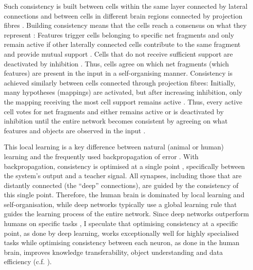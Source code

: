 Such consistency is built between cells within the same layer connected by lateral connections  and between cells in different brain regions connected by projection fibres \cite{greig_molecular_2013, liang_interactions_2017}.
Building consistency means that the cells reach a consensus on what they represent \cite{von_der_malsburg_theory_2022}: Features trigger cells belonging to specific net fragments and only remain active if other laterally connected cells contribute to the same fragment and provide mutual support . Cells that do not receive sufficient support are deactivated by inhibition .
Thus, cells agree on which net fragments (which features) are present in the input in a self-organising manner.
Consistency is achieved similarly between cells connected through projection fibres: Initially, many hypotheses (mappings) are activated, but after increasing inhibition, only the mapping receiving the most cell support remains active \cite{vogels_inhibitory_2011, von_der_malsburg_theory_2022}.
Thus, every active cell votes for net fragments and either remains active or is deactivated by inhibition until the entire network becomes consistent by agreeing on what features and objects are observed in the input \cite{von_der_malsburg_concerning_2018, von_der_malsburg_theory_2022}.

This local learning is a key difference between natural (animal or human) learning and the frequently used backpropagation of error \cite{rosenblatt_principles_1962, linnainmaa_taylor_1976}. With backpropagation, consistency is optimised at a single point \cite{crick_recent_1989, wang_comprehensive_2022}, specifically between the system's output and a teacher signal. All synapses, including those that are distantly connected (the ``deep'' connections), are guided by the consistency of this single point. Therefore, the human brain is dominated by local learning and self-organisation, while deep networks typically use a global learning rule that guides the learning process of the entire network.
Since deep networks outperform humans on specific tasks , I speculate that optimising consistency at a specific point, as done by deep learning, works exceptionally well for highly specialised tasks while optimising consistency between each neuron, as done in the human brain, improves knowledge transferability, object understanding and data efficiency (c.f. ).

